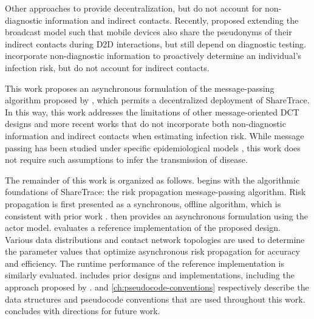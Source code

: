 Other approaches to  \citep{Cho2020, Reichert2020} provide decentralization, but do not account for non-diagnostic information and indirect contacts. Recently, \citet{Cherini2023} proposed extending the broadcast model such that mobile devices also share the pseudonyms of their indirect contacts during D2D interactions, but still depend on diagnostic testing. \citet{Gupta2023} incorporate non-diagnostic information to proactively determine an individual's infection risk, but do not account for indirect contacts.

This work proposes an asynchronous formulation of the message-passing algorithm proposed by \citet{Ayday2021}, which permits a decentralized deployment of ShareTrace. In this way, this work addresses the limitations of other message-oriented DCT designs \citep{Cho2020, Reichert2020} and more recent works \citep{Cherini2023, Gupta2023} that do not incorporate both non-diagnostic information and indirect contacts when estimating infection risk. While message passing has been studied under specific epidemiological models \citep{Karrer2010, Li2021}, this work does not require such assumptions to infer the transmission of disease.

The remainder of this work is organized as follows.  begins with the algorithmic foundations of ShareTrace: the risk propagation message-passing algorithm. Risk propagation is first presented as a synchronous, offline algorithm, which is consistent with prior work \citep{Ayday2021}.  then provides an asynchronous formulation using the actor model.  evaluates a reference implementation of the proposed design. Various data distributions and contact network topologies are used to determine the parameter values that optimize asynchronous risk propagation for accuracy and efficiency. The runtime performance of the reference implementation is similarly evaluated.  includes prior designs and implementations, including the approach proposed by \citet{Tatton2022b}.  and \cref{ch:pseudocode-conventions} respectively describe the data structures and pseudocode conventions that are used throughout this work.  concludes with directions for future work.